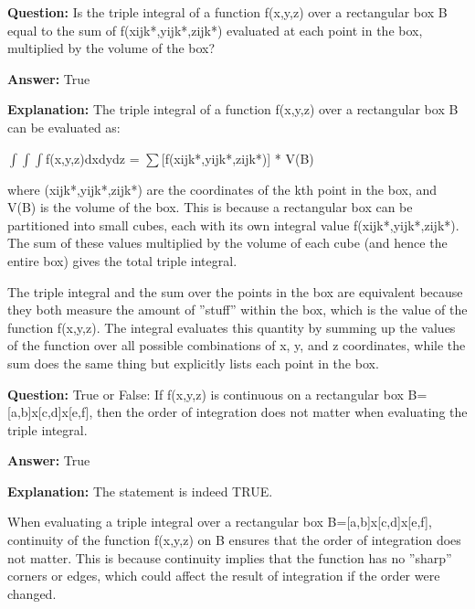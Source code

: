 \documentclass{article}
\begin{document}
                \vspace{0.5cm} 
        
            
                \textbf {Question:} Is the triple integral of a function f(x,y,z) over a rectangular box B equal to the sum of f(xijk*,yijk*,zijk*) evaluated at each point in the box, multiplied by the volume of the box?
                
                \textbf{Answer:} True

                \textbf{Explanation:} The triple integral of a function f(x,y,z) over a rectangular box B can be evaluated as:

\ensuremath{\int}\ensuremath{\int}\ensuremath{\int}f(x,y,z)dxdydz = \ensuremath{\sum}[f(xijk*,yijk*,zijk*)] * V(B)

where (xijk*,yijk*,zijk*) are the coordinates of the kth point in the box, and V(B) is the volume of the box. This is because a rectangular box can be partitioned into small cubes, each with its own integral value f(xijk*,yijk*,zijk*). The sum of these values multiplied by the volume of each cube (and hence the entire box) gives the total triple integral.

The triple integral and the sum over the points in the box are equivalent because they both measure the amount of ''stuff'' within the box, which is the value of the function f(x,y,z). The integral evaluates this quantity by summing up the values of the function over all possible combinations of x, y, and z coordinates, while the sum does the same thing but explicitly lists each point in the box.
                
                \vspace{0.5cm} 
        
            
                \textbf {Question:} True or False: If f(x,y,z) is continuous on a rectangular box B=[a,b]x[c,d]x[e,f], then the order of integration does not matter when evaluating the triple integral.
                
                \textbf{Answer:} True

                \textbf{Explanation:} The statement is indeed TRUE.

When evaluating a triple integral over a rectangular box B=[a,b]x[c,d]x[e,f], continuity of the function f(x,y,z) on B ensures that the order of integration does not matter. This is because continuity implies that the function has no ''sharp'' corners or edges, which could affect the result of integration if the order were changed.
\end{document}
